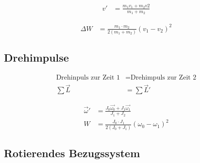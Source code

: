 \begin{boxleft}
\end{boxleft}\begin{boxrightshaded}
\begin{align}
v'		&=\frac{m_1v_1+m_2v2}{m_1+m_2}
\end{align}
\end{boxrightshaded}

\begin{boxleft}
\end{boxleft}\begin{boxrightshaded}
\begin{align}
\Delta W	&=\frac{m_1\cdot m_2}{2\left(m_1+m_2\right)}\left(v_1-v_2\right)^2
\end{align}
\end{boxrightshaded}
\subsection{Drehimpulse}

\begin{boxleft}
\end{boxleft}\begin{boxrightshaded}
\begin{align}
\text{Drehinpuls zur Zeit 1} &= \text{Drehimpuls zur Zeit 2}\\
\sum \vec{L}&=\sum \vec{L}'
\end{align}
\end{boxrightshaded}

\begin{boxleft}
\end{boxleft}\begin{boxrightshaded}
\begin{align}
\vec{\omega}'&=\frac{J_0\vec{\omega_0}+J_1\vec{\omega_1}}{J_1+J_2}\\
W&=\frac{J_0\cdot J_1}{2\left(J_0+J_1\right)}\left(\omega_0-\omega_1\right)^2
\end{align}
\end{boxrightshaded}


\subsection{Rotierendes Bezugssystem}

